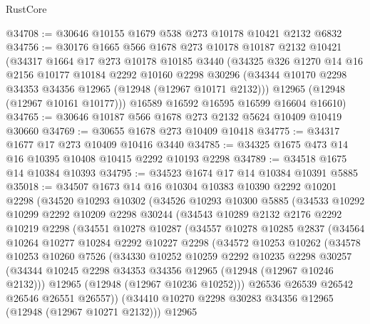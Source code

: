 \begin{lexlean}{RustCore}
\begin{coremodule}
@34708 := @30646 @10155 @1679 @538 @273 @10178 @10421 @2132 @6832
@34756 := @30176
    @1665
    @566
    @1678
    @273
    @10178
    @10187
    @2132
    @10421
    (@34317
      @1664
      @17
      @273
      @10178
      @10185
      @3440
      (@34325
        @326
        @1270
        @14
        @16
        @2156
        @10177
        @10184
        @2292
        @10160
        @2298
        @30296
        (@34344 @10170 @2298 @34353 @34356 @12965 (@12948 (@12967 @10171 @2132)))
        @12965
        (@12948 (@12967 @10161 @10177)))
      @16589
      @16592
      @16595
      @16599
      @16604
      @16610)
@34765 := @30646 @10187 @566 @1678 @273 @2132 @5624 @10409 @10419 @30660
@34769 := @30655 @1678 @273 @10409 @10418
@34775 := @34317 @1677 @17 @273 @10409 @10416 @3440
@34785 := @34325 @1675 @473 @14 @16 @10395 @10408 @10415 @2292 @10193 @2298
@34789 := @34518 @1675 @14 @10384 @10393
@34795 := @34523 @1674 @17 @14 @10384 @10391 @5885
@35018 := @34507
    @1673
    @14
    @16
    @10304
    @10383
    @10390
    @2292
    @10201
    @2298
    (@34520
      @10293
      @10302
      (@34526
        @10293
        @10300
        @5885
        (@34533
          @10292
          @10299
          @2292
          @10209
          @2298
          @30244
          (@34543
            @10289
            @2132
            @2176
            @2292
            @10219
            @2298
            (@34551
              @10278
              @10287
              (@34557
                @10278
                @10285
                @2837
                (@34564
                  @10264
                  @10277
                  @10284
                  @2292
                  @10227
                  @2298
                  (@34572
                    @10253
                    @10262
                    (@34578
                      @10253
                      @10260
                      @7526
                      (@34330
                        @10252
                        @10259
                        @2292
                        @10235
                        @2298
                        @30257
                        (@34344 @10245 @2298 @34353 @34356 @12965 (@12948 (@12967 @10246 @2132)))
                        @12965
                        (@12948 (@12967 @10236 @10252)))
                      @26536
                      @26539
                      @26542
                      @26546
                      @26551
                      @26557))
                  (@34410 @10270 @2298 @30283 @34356 @12965 (@12948 (@12967 @10271 @2132)))
                  @12965

\end{coremodule}
\end{lexlean}
